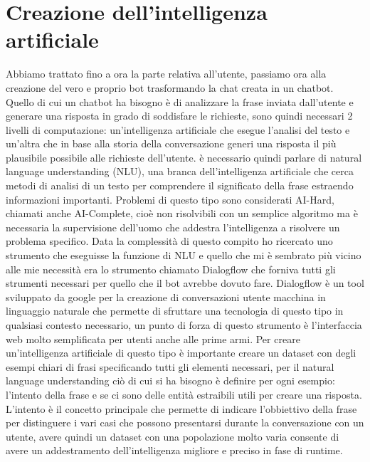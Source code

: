 \section{Creazione dell'intelligenza artificiale}

Abbiamo trattato fino a ora la parte relativa all'utente, passiamo ora alla creazione del vero e proprio bot trasformando la chat creata in un chatbot. Quello di cui un chatbot ha bisogno è di analizzare la frase inviata dall'utente e generare una risposta in grado di soddisfare le richieste, sono quindi necessari 2 livelli di computazione: un'intelligenza artificiale che esegue l'analisi del testo e un'altra che in base alla storia della conversazione generi una risposta il più plausibile possibile alle richieste dell'utente.
è necessario quindi parlare di natural language understanding (NLU), una branca dell'intelligenza artificiale che cerca metodi di analisi di un testo per comprendere il significato della frase estraendo informazioni importanti. Problemi di questo tipo sono considerati AI-Hard, chiamati anche AI-Complete, cioè non risolvibili con un semplice algoritmo ma è necessaria la supervisione dell'uomo che addestra l'intelligenza a risolvere un problema specifico.
Data la complessità di questo compito ho ricercato uno strumento che eseguisse la funzione di NLU e quello che mi è sembrato più vicino alle mie necessità era lo strumento chiamato Dialogflow che forniva tutti gli strumenti necessari per quello che il bot avrebbe dovuto fare.
Dialogflow è un tool sviluppato da google per la creazione di conversazioni utente macchina in linguaggio naturale che permette di sfruttare una tecnologia di questo tipo in qualsiasi contesto necessario, un punto di forza di questo strumento è l'interfaccia web molto semplificata per utenti anche alle prime armi.
Per creare un'intelligenza artificiale di questo tipo è importante creare un dataset con degli esempi chiari di frasi specificando tutti gli elementi necessari, per il natural language understanding ciò di cui si ha bisogno è definire per ogni esempio: l'intento della frase e se ci sono delle entità estraibili utili per creare una risposta.
L'intento è il concetto principale che permette di indicare l'obbiettivo della frase per distinguere i vari casi che possono presentarsi durante la conversazione con un utente, avere quindi un dataset con una popolazione molto varia consente di avere un addestramento dell'intelligenza migliore e preciso in fase di runtime.
